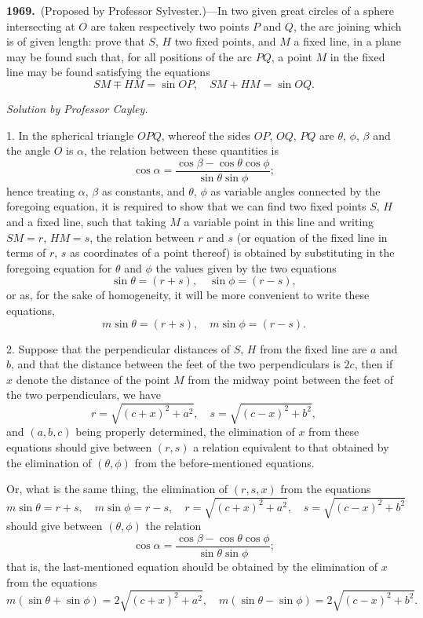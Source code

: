 \documentclass[11pt,a4paper]{article}
\theoremstyle{plain}
\theoremstyle{definition}
\theoremstyle{remark}
\begin{document}
\textbf{1969.}\ (Proposed by Professor Sylvester.)---In two given great circles of a sphere intersecting at $O$ are taken respectively two points $P$ and $Q$, the arc joining which is of given length: prove that $S$, $H$ two fixed points, and $M$ a fixed line, in a plane may be found such that, for all positions of the arc $PQ$, a point $M$ in the fixed line may be found satisfying the equations
\[
SM \mp HM = \sin OP,\quad SM + HM = \sin OQ.
\]

\textit{Solution by Professor Cayley.}

1. In the spherical triangle $OPQ$, whereof the sides $OP$, $OQ$, $PQ$ are $\theta$, $\phi$, $\beta$ and the angle $O$ is $\alpha$, the relation between these quantities is
\[
\cos\alpha = \frac{\cos\beta-\cos\theta\cos\phi}{\sin\theta\sin\phi};
\]
hence treating $\alpha$, $\beta$ as constants, and $\theta$, $\phi$ as variable angles connected by the foregoing equation, it is required to show that we can find two fixed points $S$, $H$ and a fixed line, such that taking $M$ a variable point in this line and writing $SM=r$, $HM=s$, the relation between $r$ and $s$ (or equation of the fixed line in terms of $r$, $s$ as coordinates of a point thereof) is obtained by substituting in the foregoing equation for $\theta$ and $\phi$ the values given by the two equations
\[
\sin\theta=(r+s),\quad \sin\phi=(r-s),
\]
or as, for the sake of homogeneity, it will be more convenient to write these equations,
\[
m\sin\theta=(r+s),\quad m\sin\phi=(r-s).
\]

2. Suppose that the perpendicular distances of $S$, $H$ from the fixed line are $a$ and $b$, and that the distance between the feet of the two perpendiculars is $2c$, then if $x$ denote the distance of the point $M$ from the midway point between the feet of the two perpendiculars, we have
\[
r=\sqrt{(c+x)^{2}+a^{2}},\quad s=\sqrt{(c-x)^{2}+b^{2}},
\]
and $(a,b,c)$ being properly determined, the elimination of $x$ from these equations should give between $(r,s)$ a relation equivalent to that obtained by the elimination of $(\theta,\phi)$ from the before-mentioned equations.

Or, what is the same thing, the elimination of $(r,s,x)$ from the equations
\[
m\sin\theta=r+s,\quad m\sin\phi=r-s,\quad r=\sqrt{(c+x)^{2}+a^{2}},\quad s=\sqrt{(c-x)^{2}+b^{2}}
\]
should give between $(\theta,\phi)$ the relation
\[
\cos\alpha=\frac{\cos\beta-\cos\theta\cos\phi}{\sin\theta\sin\phi};
\]
that is, the last-mentioned equation should be obtained by the elimination of $x$ from the equations
\[
m(\sin\theta+\sin\phi)=2\sqrt{(c+x)^{2}+a^{2}},\quad m(\sin\theta-\sin\phi)=2\sqrt{(c-x)^{2}+b^{2}}.
\]
\end{document}
